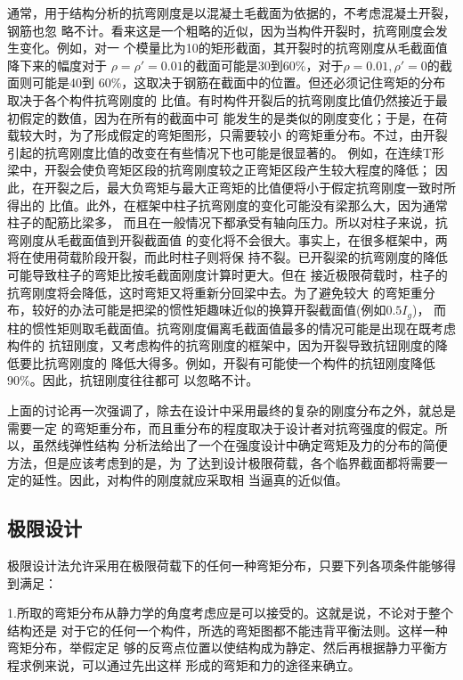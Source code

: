 \documentclass[12pt,a4paper]{book}
\begin{document}
通常，用于结构分析的抗弯刚度是以混凝土毛截面为依据的，不考虑混凝土开裂，钢筋也忽
略不计。看来这是一个粗略的近似，因为当构件开裂时，抗弯刚度会发生变化。例如，对一
个模量比为10的矩形截面，其开裂时的抗弯刚度从毛截面值降下来的幅度对于
$\rho=\rho'=0.01$的截面可能是30到60\%，对于$\rho=0.01,\rho'=0$的截面则可能是40到
60\%，这取决于钢筋在截面中的位置。但还必须记住弯矩的分布取决于各个构件抗弯刚度的
比值。有时构件开裂后的抗弯刚度比值仍然接近于最初假定的数值，因为在所有的截面中可
能发生的是类似的刚度变化；于是，在荷载较大时，为了形成假定的弯矩图形，只需要较小
的弯矩重分布。不过，由开裂引起的抗弯刚度比值的改变在有些情况下也可能是很显著的。
例如，在连续T形梁中，开裂会使负弯矩区段的抗弯刚度较之正弯矩区段产生较大程度的降低；
因此，在开裂之后，最大负弯矩与最大正弯矩的比值便将小于假定抗弯刚度一致时所得出的
比值。此外，在框架中柱子抗弯刚度的变化可能没有梁那么大，因为通常柱子的配筋比梁多，
而且在一般情况下都承受有轴向压力。所以对柱子来说，抗弯刚度从毛截面值到开裂截面值
的变化将不会很大。事实上，在很多框架中，两将在使用荷载阶段开裂，而此时柱子则将保
持不裂。已开裂梁的抗弯刚度的降低可能导致柱子的弯矩比按毛截面刚度计算时更大。但在
接近极限荷载时，柱子的抗弯刚度将会降低，这时弯矩又将重新分回梁中去。为了避免较大
的弯矩重分布，较好的办法可能是把梁的惯性矩趣味近似的换算开裂截面值(例如$0.5I_g$)，
而柱的惯性矩则取毛截面值。抗弯刚度偏离毛截面值最多的情况可能是出现在既考虑构件的
抗钮刚度，又考虑构件的抗弯刚度的框架中，因为开裂导致抗钮刚度的降低要比抗弯刚度的
降低大得多。例如，开裂有可能使一个构件的抗钮刚度降低90\%。因此，抗钮刚度往往都可
以忽略不计。

上面的讨论再一次强调了，除去在设计中采用最终的复杂的刚度分布之外，就总是需要一定
的弯矩重分布，而且重分布的程度取决于设计者对抗弯强度的假定。所以，虽然线弹性结构
分析法给出了一个在强度设计中确定弯矩及力的分布的简便方法，但是应该考虑到的是，为
了达到设计极限荷载，各个临界截面都将需要一定的延性。因此，对构件的刚度就应采取相
当逼真的近似值。

\subsection{极限设计}

极限设计法允许采用在极限荷载下的任何一种弯矩分布，只要下列各项条件能够得到满足：

1.所取的弯矩分布从静力学的角度考虑应是可以接受的。这就是说，不论对于整个结构还是
对于它的任何一个构件，所选的弯矩图都不能违背平衡法则。这样一种弯矩分布，举假定足
够的反弯点位置以使结构成为静定、然后再根据静力平衡方程求例来说，可以通过先出这样
形成的弯矩和力的途径来确立。
\end{document}
